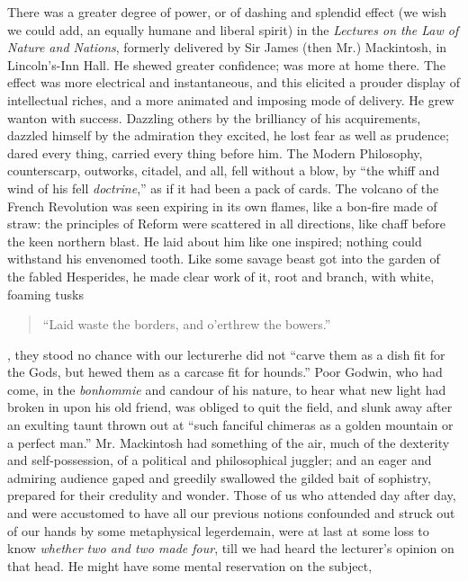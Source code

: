 There was a greater degree of power, or of dashing and splendid
effect (we wish we could add, an equally humane and liberal
spirit) in the \emph{Lectures on the Law of Nature and Nations},
formerly delivered by Sir James (then Mr.) Mackintosh, in
Lincoln's-Inn Hall. He shewed greater confidence; was more at home
there. The effect was more electrical and instantaneous, and this
elicited a prouder display of intellectual riches, and a more
animated and imposing mode of delivery. He grew wanton with
success. Dazzling others by the brilliancy of his acquirements,
dazzled himself by the admiration they excited, he lost fear as
well as prudence; dared every thing, carried every thing before
him. The Modern Philosophy, counterscarp, outworks, citadel, and
all, fell without a blow, by ``the whiff and wind of his fell
\emph{doctrine},'' as if it had been a pack of cards. The volcano
of the French Revolution was seen expiring in its own flames, like
a bon-fire made of straw: the principles of Reform were scattered
in all directions, like chaff before the keen northern blast. He
laid about him like one inspired; nothing could withstand his
envenomed tooth. Like some savage beast got into the garden of the
fabled Hesperides, he made clear work of it, root and branch, with
white, foaming tusks\textemdash
\begin{quote} ``Laid waste the borders, and o'erthrew the
bowers.''
\end{quote} 
, they stood no chance
with our lecturer\textemdash he did not ``carve them as a dish fit
for the Gods, but hewed them as a carcase fit for hounds.'' Poor
Godwin, who had come, in the \emph{bonhommie} and candour of his
nature, to hear what new light had broken in upon his old friend,
was obliged to quit the field, and slunk away after an exulting
taunt thrown out at ``such fanciful chimeras as a golden mountain
or a perfect man.'' Mr. Mackintosh had something of the air, much
of the dexterity and self-possession, of a political and
philosophical juggler; and an eager and admiring audience gaped
and greedily swallowed the gilded bait of sophistry, prepared for
their credulity and wonder. Those of us who attended day after
day, and were accustomed to have all our previous notions
confounded and struck out of our hands by some metaphysical
legerdemain, were at last at some loss to know \emph{whether two
  and two made four}, till we had heard the lecturer's opinion on
that head. He might have some mental reservation on the subject,
